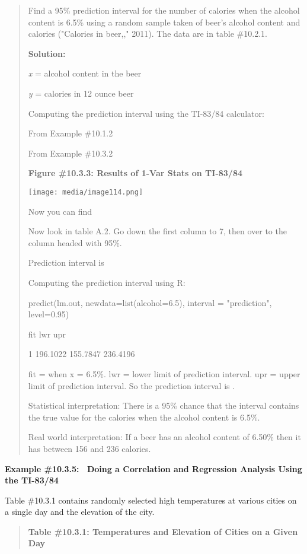 \documentclass[]{book}
\begin{document}
\begin{quote}
Find a 95\% prediction interval for the number of calories when the
alcohol content is 6.5\% using a random sample taken of beer's alcohol
content and calories ("Calories in beer,," 2011). The data are in
table \#10.2.1.

\textbf{Solution:}

\emph{x} = alcohol content in the beer

\emph{y} = calories in 12 ounce beer

Computing the prediction interval using the TI-83/84 calculator:

From Example \#10.1.2

From Example \#10.3.2

\textbf{Figure \#10.3.3: Results of 1-Var Stats on TI-83/84}

\texttt{[image: media/image114.png]}

Now you can find

Now look in table A.2. Go down the first column to 7, then over to the
column headed with 95\%.

Prediction interval is

Computing the prediction interval using R:

predict(lm.out, newdata=list(alcohol=6.5), interval = "prediction",
level=0.95)

fit lwr upr

1 196.1022 155.7847 236.4196

fit = when x = 6.5\%. lwr = lower limit of prediction interval. upr =
upper limit of prediction interval. So the prediction interval is .

Statistical interpretation: There is a 95\% chance that the interval
contains the true value for the calories when the alcohol content is
6.5\%.

Real world interpretation: If a beer has an alcohol content of 6.50\%
then it has between 156 and 236 calories.
\end{quote}

\textbf{Example \#10.3.5:~ Doing a Correlation and Regression Analysis Using
the TI-83/84}

Table \#10.3.1 contains randomly selected high temperatures at various
cities on a single day and the elevation of the city.

\begin{quote}
\textbf{Table \#10.3.1: Temperatures and Elevation of Cities on a Given
Day}
\end{quote}
\end{document}
